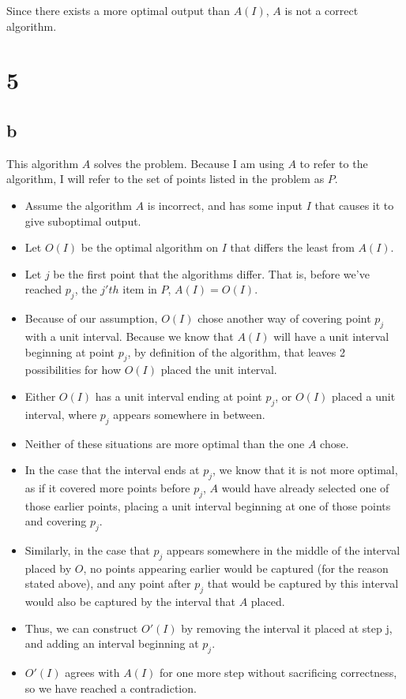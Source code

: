 \documentclass[letterpaper,notitlepage,twoside]{article}
\begin{document}
Since there exists a more optimal output than $A(I)$, $A$ is not a correct algorithm.
\section*{5}
\subsection*{b}
This algorithm $A$ solves the problem. Because I am using $A$ to refer to the algorithm, I will refer to the set of points listed in the problem as $P$. 
\begin{itemize}
	\item Assume the algorithm $A$ is incorrect, and has some input $I$ that causes it to give suboptimal output. 
	\item Let $O(I)$ be the optimal algorithm on $I$ that differs the least from $A(I)$. 
	\item Let $j$ be the first point that the algorithms differ. That is, before we've reached $p_j$, the $j'th$ item in $P$, $A(I)=O(I)$. 
	\item Because of our assumption, $O(I)$ chose another way of covering point $p_j$ with a unit interval. Because we know that $A(I)$ will have a unit interval beginning at point $p_j$, by definition of the algorithm, that leaves 2 possibilities for how $O(I)$ placed the unit interval. 
	\item Either $O(I)$ has a unit interval ending at point $p_j$, or $O(I)$ placed a unit interval, where $p_j$ appears somewhere in between. 
	\item Neither of these situations are more optimal than the one $A$ chose. 
	\item In the case that the interval ends at $p_j$, we know that it is not more optimal, as if it covered more points before $p_j$, $A$ would have already selected one of those earlier points, placing a unit interval beginning at one of those points and covering $p_j$. 
	\item Similarly, in the case that $p_j$ appears somewhere in the middle of the interval placed by $O$, no points appearing earlier would be captured (for the reason stated above), and any point after $p_j$ that would be captured by this interval would also be captured by the interval that $A$ placed.
	\item Thus, we can construct $O'(I)$ by removing the interval it placed at step j, and adding an interval beginning at $p_j$. 
	\item $O'(I)$ agrees with $A(I)$ for one more step without sacrificing correctness, so we have reached a contradiction. 
\end{itemize}	
\end{document}
